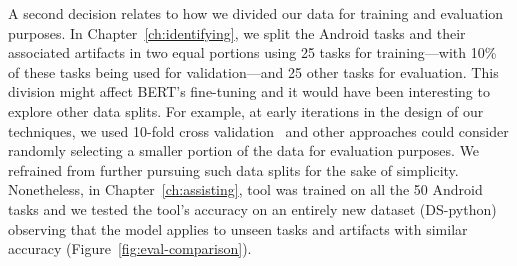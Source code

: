 A second decision relates to how we
divided our data for training and evaluation purposes. 
In Chapter~\ref{ch:identifying}, 
we split the Android tasks and their associated artifacts in two equal portions using 
25 tasks for training---with 10\% of these tasks being used for validation---and 
25 other tasks for evaluation.
This division might affect BERT's fine-tuning and it would have been interesting 
to explore other data splits. 
For example, at early iterations in the design of our techniques, 
we used 10-fold cross validation~\cite{stone1974cross} 
and other approaches could consider randomly selecting a smaller portion of 
the data for evaluation purposes. 
We refrained from further pursuing such data splits for the sake of simplicity.
Nonetheless, in Chapter~\ref{ch:assisting},
\acs{tool} was trained on all the 50 Android tasks 
and we tested the tool's accuracy on an entirely new dataset (\acs{DS-python})
observing that the model applies to unseen tasks and artifacts
with similar accuracy (Figure~\ref{fig:eval-comparison}).









